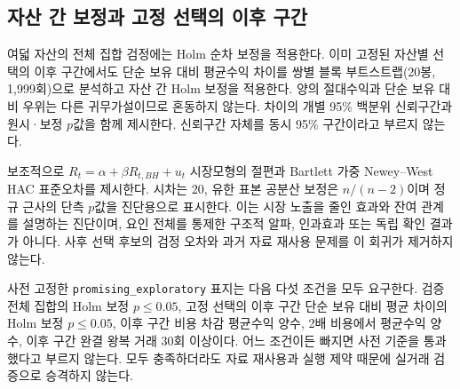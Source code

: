 \documentclass[11pt,a4paper]{article}
\begin{document}
\subsection{자산 간 보정과 고정 선택의 이후 구간}
여덟 자산의 전체 집합 검정에는 Holm 순차 보정\cite{holm}을 적용한다. 이미 고정된 자산별 선택의 이후 구간에서도 단순 보유 대비 평균수익 차이를 쌍별 블록 부트스트랩(20봉, 1,999회)으로 분석하고 자산 간 Holm 보정을 적용한다. 양의 절대수익과 단순 보유 대비 우위는 다른 귀무가설이므로 혼동하지 않는다. 차이의 개별 95\% 백분위 신뢰구간과 원시·보정 $p$값을 함께 제시한다. 신뢰구간 자체를 동시 95\% 구간이라고 부르지 않는다.

보조적으로 $R_t=\alpha+\beta R_{t,BH}+u_t$ 시장모형의 절편과 Bartlett 가중 Newey--West HAC 표준오차\cite{neweywest}를 제시한다. 시차는 20, 유한 표본 공분산 보정은 $n/(n-2)$이며 정규 근사의 단측 $p$값을 진단용으로 표시한다. 이는 시장 노출을 줄인 효과와 잔여 관계를 설명하는 진단이며, 요인 전체를 통제한 구조적 알파, 인과효과 또는 독립 확인 결과가 아니다. 사후 선택 후보의 검정 오차와 과거 자료 재사용 문제를 이 회귀가 제거하지 않는다.

사전 고정한 \texttt{promising\_exploratory} 표지는 다음 다섯 조건을 모두 요구한다. 검증 전체 집합의 Holm 보정 $p\le0.05$, 고정 선택의 이후 구간 단순 보유 대비 평균 차이의 Holm 보정 $p\le0.05$, 이후 구간 비용 차감 평균수익 양수, 2배 비용에서 평균수익 양수, 이후 구간 완결 왕복 거래 30회 이상이다. 어느 조건이든 빠지면 사전 기준을 통과했다고 부르지 않는다. 모두 충족하더라도 자료 재사용과 실행 제약 때문에 실거래 검증으로 승격하지 않는다.
\end{document}
